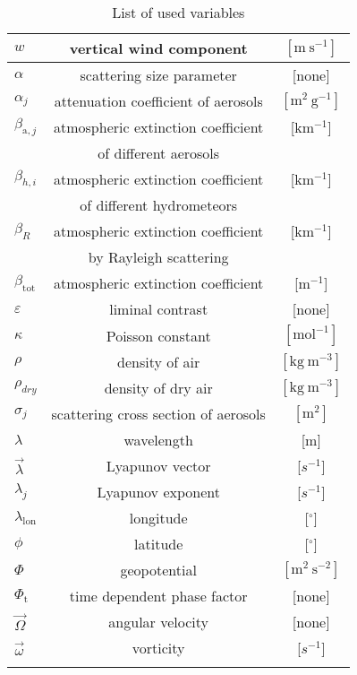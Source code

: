\begin{longtable}[H]{|l|c|c|}
\hline
$w$ & vertical wind component& $\left[\mathrm{ m \ s^{-1} }\right]$\\
\hline
$\alpha$ & scattering size parameter &[none]\\
\hline
$\alpha_{j}$ & attenuation coefficient of aerosols&$\left[\mathrm{ m^{2} \ g^{-1} }\right]$\\
\hline
$\beta_{\mathrm{a},j}$ & atmospheric extinction coefficient &[$\mathrm{km^{-1}}$]\\
     & of different aerosols &     \\
\hline
$\beta_{h,i}$ & atmospheric extinction coefficient  &[$\mathrm{km^{-1}}$]\\
& of different hydrometeors &\\
\hline
$\beta_{R}$ & atmospheric extinction coefficient  &[$\mathrm{km^{-1}}$]\\
& by Rayleigh scattering &\\
\hline
$\beta_{\mathrm{tot}}$ & atmospheric extinction coefficient&[$\mathrm{m^{-1}}$]\\
\hline
$\varepsilon$ &liminal contrast&[none]\\
\hline
$\kappa$ & Poisson constant & $\left[\mathrm{ mol^{-1} }\right]$\\
\hline
$\rho$ &density of air& $\left[\mathrm{ kg\ m^{-3} }\right]$\\
\hline
$\rho_{dry}$ &density of dry air& $\left[\mathrm{ kg\ m^{-3} }\right]$\\
\hline
$\sigma_{j}$ & scattering cross section of aerosols&$\left[\mathrm{ m^{2} }\right]$\\
\hline
$\lambda$ & wavelength & [m]\\
\hline
$\vec{\lambda}$ & Lyapunov vector& [$s^{-1}$]\\
\hline
$\lambda_{j}$ & Lyapunov exponent& [$s^{-1}$]\\
\hline
$\lambda_{\mathrm{lon}}$ & longitude & [$^{\circ}$]\\
\hline
$\phi$ & latitude &[$^{\circ}$]\\
\hline
$\Phi$ & geopotential &$\left[\mathrm{ m ^{2}\ s^{-2} }\right]$\\
\hline
$\Phi_{\mathrm{t}}$ & time dependent phase factor &[none]\\
\hline
$\vec{\Omega}$ & angular velocity & [none]\\
\hline
$\vec{\omega}$ & vorticity & [$s^{-1}$]\\
\hline

\caption{List of used variables \label{tab: variables}}
\end{longtable}
